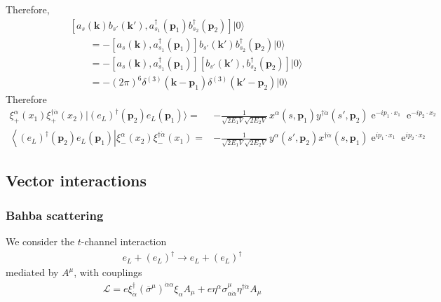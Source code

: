 Therefore,
\begin{align}
&\left[ a_s(\mathbf{k})b_{s'}(\mathbf{k}'),a_{s_1}^\dagger(\mathbf{p}_1)b_{s_2}^\dagger(\mathbf{p}_2)\right] |0\rangle \nonumber\\
&\qquad=
-
 \left[ a_s(\mathbf{k}),a_{s_1}^\dagger(\mathbf{p}_1)\right]b_{s'}(\mathbf{k}')b_{s_2}^\dagger(\mathbf{p}_2) |0\rangle \nonumber\\
&\qquad=-
  \left[ a_s(\mathbf{k}),a_{s_1}^\dagger(\mathbf{p}_1)\right] \left[ b_{s'}(\mathbf{k}'),b_{s_2}^\dagger(\mathbf{p}_2)  \right] |0\rangle \nonumber\\
&\qquad= -(2\pi)^6  
    \delta^{(3)}(\mathbf{k}-\mathbf{p}_1)\delta^{(3)}(\mathbf{k}'-\mathbf{p}_2)|0\rangle
\end{align}
Therefore
\begin{align}
\label{eq:bkeldel}
    \xi^\alpha_{+}(x_1)\xi^{\dagger\dot{\alpha}}_{+}(x_2)|\left(e_L\right)^{\dagger}(\mathbf{p}_2)e_L(\mathbf{p}_1)\rangle=&
-\frac{1}{\sqrt{2E_1 V}\sqrt{2E_2 V}}\,x^\alpha(s,\mathbf{p}_1)y^{\dagger\dot{\alpha}}(s',\mathbf{p}_2)\operatorname{e}^{-i p_1\cdot x_1}\operatorname{e}^{-i p_2\cdot x_2} \nonumber\\
   \left\langle\left(e_L\right)^{\dagger}(\mathbf{p}_2) e_L(\mathbf{p}_1) \right|\xi^{\alpha}_-(x_2)\xi^{\dagger\dot{\alpha}}_-\left( x_1 \right)=&
-\frac{1}{\sqrt{2E_1 V}\sqrt{2E_2 V}}\,y^{\alpha}(s',\mathbf{p}_2) x^{\dagger\dot{\alpha}}(s,\mathbf{p}_1)\operatorname{e}^{i p_1\cdot x_1}\operatorname{e}^{i p_2\cdot x_2}
\end{align}

\subsection{Vector interactions}

\subsubsection{Bahba scattering}

We consider the $t$-channel interaction
\begin{align}
  e_L+\left( e_L \right)^{\dagger} \to   e_L+\left( e_L \right)^{\dagger}
\end{align}
mediated by $A^{\mu}$, with couplings
\begin{align}
\label{eq:xietaz}
\mathcal{L}=e \xi^{\dagger}_{\dot{\alpha}}\left( \overline{\sigma}^{\mu} \right)^{\dot{\alpha}\alpha}\xi_{\alpha} A_{\mu}
+e \eta^{\alpha} \sigma^{\mu}_{\alpha\dot{\alpha}} \eta^{\dagger\dot{\alpha}} A_{\mu}
\end{align}


